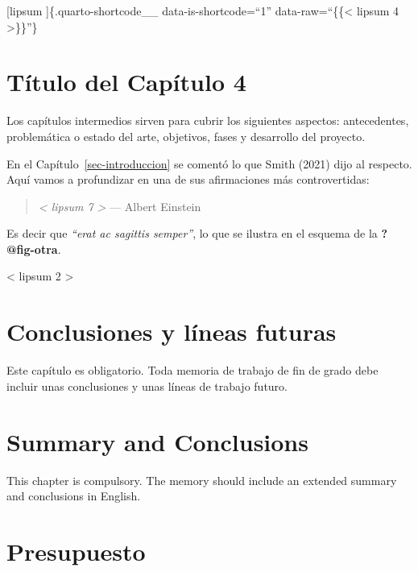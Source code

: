 \documentclass[
  letterpaper,
  DIV=11,
  numbers=noendperiod]{scrreprt}
\begin{document}
\noindent [lipsum {} {]}\{.quarto-shortcode\_\_ data-is-shortcode=``1''
data-raw=``\{\{\textless{} lipsum 4 \textgreater\}\}''\}


\chapter{Título del Capítulo 4}\label{sec-capitulo-cuatro}

\noindent Los capítulos intermedios sirven para cubrir los siguientes
aspectos: antecedentes, problemática o estado del arte, objetivos, fases
y desarrollo del proyecto.

En el Capítulo~\ref{sec-introduccion} se comentó lo que Smith (2021)
dijo al respecto. Aquí vamos a profundizar en una de sus afirmaciones
más controvertidas:

\begin{quote}
\emph{{{< lipsum 7 >}}} --- Albert Einstein
\end{quote}

Es decir que \emph{``erat ac sagittis semper''}, lo que se ilustra en el
esquema de la \textbf{?@fig-otra}.

{{< lipsum 2 >}}


\chapter{Conclusiones y líneas futuras}\label{sec-conclusiones}

\noindent Este capítulo es obligatorio. Toda memoria de trabajo de fin
de grado debe incluir unas conclusiones y unas líneas de trabajo futuro.


\chapter{Summary and Conclusions}\label{sec-conclusions}

\noindent This chapter is compulsory. The memory should include an
extended summary and conclusions in English.


\chapter{Presupuesto}\label{sec-presupuesto}
\end{document}
